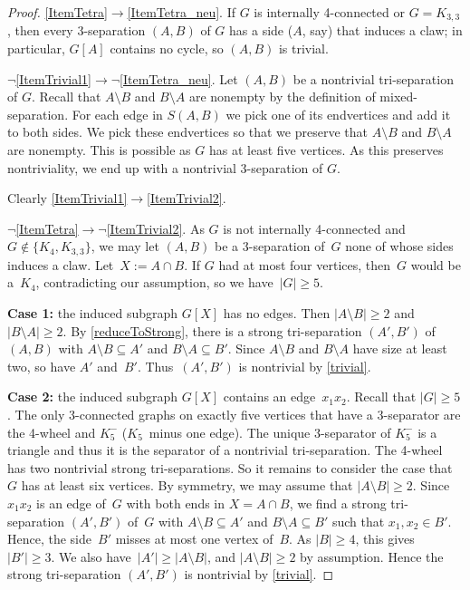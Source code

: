 \documentclass{aic}
\newcommand{\se}{\subseteq}
\theoremstyle{plain}
\theoremstyle{definition}
\theoremstyle{plain}
\theoremstyle{plain}
\newcommand{\sm}{\setminus}
\renewcommand{\geq}{\geqslant}
\renewcommand{\ge}{\geqslant}
\begin{document}
\begin{proof}
\ref{ItemTetra}$\rightarrow$\ref{ItemTetra_neu}.
If $G$ is internally 4-connected or $G=K_{3,3}$, then every 3-separation $(A,B)$ of $G$ has a side ($A$, say) that induces a claw; in particular, $G[A]$ contains no cycle, so $(A,B)$ is trivial.

$\neg$\ref{ItemTrivial1}$\to\neg$\ref{ItemTetra_neu}.
Let $(A,B)$ be a nontrivial tri-separation of $G$.
Recall that $A\sm B$ and $B\sm A$ are nonempty by the definition of mixed-separation.
For each edge in $S(A,B)$ we pick one of its endvertices and add it to both sides. 
We pick these endvertices so that we preserve that $A\sm B$ and $B\sm A$ are nonempty. 
This is possible as $G$ has at least five vertices. As this preserves nontriviality, we end up with a nontrivial 3-separation of $G$. 

Clearly \ref{ItemTrivial1}$\to $\ref{ItemTrivial2}.



$\neg$\ref{ItemTetra}$\to\neg$\ref{ItemTrivial2}.
As $G$ is not internally 4-connected and $G\notin\{K_4,K_{3,3}\}$, we may let $(A,B)$ be a 3-separation of~$G$ none of whose sides induces a claw.
Let~$X:=A\cap B$.
If $G$ had at most four vertices, then~$G$ would be a~$K_4$, contradicting our assumption, so we have~$|G|\ge 5$.

{\bf Case 1:} the induced subgraph $G[X]$ has no edges.
Then $|A\sm B|\geq 2$ and~$|B\sm A|\geq 2$.
By \autoref{reduceToStrong}, there is a strong tri-separation $(A',B')$ of~$(A,B)$ with $A\sm B\se A'$ and $B\sm A\se B'$.
Since $A\sm B$ and $B\sm A$ have size at least two, so have $A'$ and~$B'$.
Thus~$(A',B')$ is nontrivial by \autoref{trivial}.

{\bf Case 2:} the induced subgraph $G[X]$ contains an edge~$x_1 x_2$.
Recall that $|G|\ge 5$.
The only 3-connected graphs on exactly five vertices that have a 3-separator are the 4-wheel and
$K_5^-$ ($K_5$~minus one edge). The unique $3$-separator of
$K_5^-$ is a triangle and thus it is the separator of a nontrivial tri-separation.
The 4-wheel has two nontrivial strong tri-separations.
So it remains to consider the
case that $G$ has at least six vertices. 
By symmetry, we may assume that $|A\sm B|\geq 2$.
Since $x_1 x_2$ is an edge of~$G$ with both ends in $X=A\cap B$, we find a strong tri-separation $(A',B')$ of~$G$ with $A\sm B\se A'$ and $B\sm A\se B'$ such that $x_1,x_2\in B'$.
Hence, the side~$B'$ misses at most one vertex of~$B$.
As $|B|\geq 4$, this gives~$|B'|\geq 3$. 
We also have~$|A'|\geq |A\sm B|$, and $|A\sm B|\ge 2$ by assumption. Hence the strong tri-separation $(A',B')$ is nontrivial by \autoref{trivial}.
\end{proof}
\end{document}
